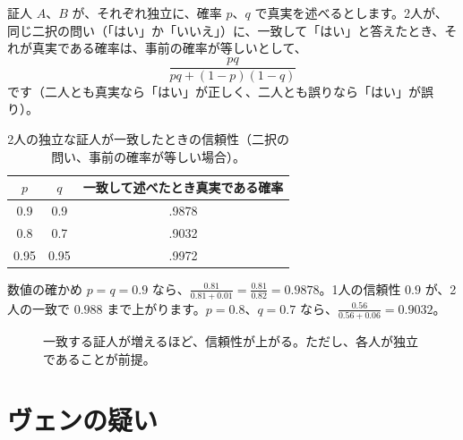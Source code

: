\documentclass[a4paper,11pt,openany]{ltjsbook}
\begin{document}
証人 $A$、$B$ が、それぞれ独立に、確率 $p$、$q$ で真実を述べるとします。2人が、同じ二択の問い（「はい」か「いいえ」）に、一致して「はい」と答えたとき、それが真実である確率は、事前の確率が等しいとして、
\[
\frac{pq}{pq+(1-p)(1-q)}
\]
です（二人とも真実なら「はい」が正しく、二人とも誤りなら「はい」が誤り）。

\begin{table}[htbp]
\centering
\begin{tabular}{cc|c}
\toprule
$p$ & $q$ & 一致して述べたとき真実である確率\\
\midrule
0.9 & 0.9 & .9878\\
0.8 & 0.7 & .9032\\
0.95 & 0.95 & .9972\\
\bottomrule
\end{tabular}
\caption{2人の独立な証人が一致したときの信頼性（二択の問い、事前の確率が等しい場合）。}
\end{table}

\begin{examplebox}{数値の確かめ}
$p=q=0.9$ なら、$\tfrac{0.81}{0.81+0.01}=\tfrac{0.81}{0.82}=0.9878$。1人の信頼性 $0.9$ が、2人の一致で $0.988$ まで上がります。$p=0.8$、$q=0.7$ なら、$\tfrac{0.56}{0.56+0.06}=0.9032$。
\end{examplebox}

\begin{figure}[htbp]
\centering
{}
\caption{一致する証人が増えるほど、信頼性が上がる。ただし、各人が独立であることが前提。}
\end{figure}

\section{ヴェンの疑い}
\end{document}
